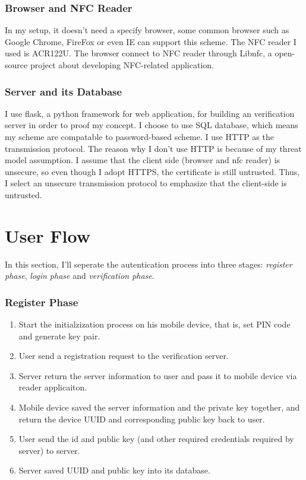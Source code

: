\begin{CJK}{Bg5}{bsmi}
\subsubsection{Browser and NFC Reader}
In my setup, it doesn't need a specify browser, some common browser such as Google Chrome, FireFox or even IE can support this scheme. The NFC reader I used is ACR122U. The browser connect to NFC reader through Libnfc, a open-source project about developing NFC-related application.

\subsubsection{Server and its Database}

I use flask, a python framework for web application, for building an verification server in order to proof my concept. I choose to use SQL database, which means my scheme are compatable to password-based scheme. I use HTTP as the transmission protocol. The reason why I don't use HTTP is because of my threat model assumption. I assume that the client side (browser and nfc reader) is unsecure, so even though I adopt HTTPS, the certificate is still untrusted. Thus, I select an unsecure transmission protocol to emphasize that the client-side is untrusted.

\section{User Flow}

In this section, I'll seperate the autentication process into three stages: \emph{register phase}, \emph{login phase} and \emph{verification phase}.

\subsubsection{Register Phase}

\begin{enumerate}
\item Start the initialzization process on his mobile device, that is, set PIN code and generate key pair.
\item User send a registration request to the verification server.
\item Server return the server information to user and pass it to mobile device via reader applicaiton.
\item Mobile device saved the server information and the private key together, and return the device UUID and corresponding public key back to user.
\item User send the id and public key (and other required credentials required by server) to server.
\item Server saved UUID and public key into its database.
\end{enumerate}


\end{CJK}
